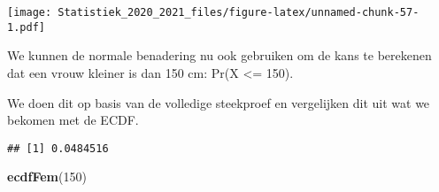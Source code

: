 \documentclass[
  12pt,dutch,coursenotes]{book}
\newenvironment{Shaded}{\begin{snugshade}}{\end{snugshade}}
\newcommand{\DataTypeTok}[1]{\textcolor[rgb]{0.13,0.29,0.53}{#1}}
\newcommand{\DecValTok}[1]{\textcolor[rgb]{0.00,0.00,0.81}{#1}}
\newcommand{\KeywordTok}[1]{\textcolor[rgb]{0.13,0.29,0.53}{\textbf{#1}}}
\newcommand{\NormalTok}[1]{#1}
\newcommand{\OperatorTok}[1]{\textcolor[rgb]{0.81,0.36,0.00}{\textbf{#1}}}
\newcommand{\StringTok}[1]{\textcolor[rgb]{0.31,0.60,0.02}{#1}}
\theoremstyle{definition}
\theoremstyle{definition}
\theoremstyle{definition}
\theoremstyle{remark}
\begin{document}
\begin{Shaded}
\end{Shaded}

\texttt{[image: Statistiek\_2020\_2021\_files/figure-latex/unnamed-chunk-57-1.pdf]}

We kunnen de normale benadering nu ook gebruiken om de kans te berekenen dat een vrouw kleiner is dan 150 cm: Pr(X \textless= 150).

We doen dit op basis van de volledige steekproef en vergelijken dit uit wat we bekomen met de ECDF.

\begin{Shaded}
\end{Shaded}

\begin{verbatim}
## [1] 0.0484516
\end{verbatim}

\begin{Shaded}
\begin{Highlighting}[]
\KeywordTok{ecdfFem}\NormalTok{(}\DecValTok{150}\NormalTok{)}
\end{Highlighting}
\end{Shaded}
\end{document}

